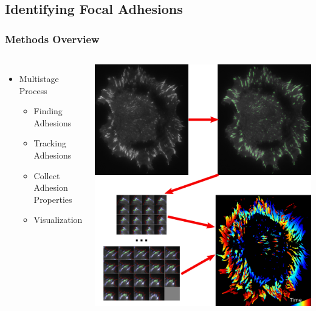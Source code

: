 \documentclass{beamer}
\newcommand{\figref}[1]{\begin{flushright}{\tiny #1 }\end{flushright}}
\begin{document}
\subsection{Identifying Focal Adhesions}
\begin{frame}
	\frametitle{Methods Overview}
	\begin{columns}
	\begin{itemize}
	\item Multistage Process
		\begin{itemize}
		\item Finding Adhesions
		\item Tracking Adhesions
		\item Collect Adhesion Properties
		\item Visualization
		\end{itemize}
	\end{itemize}
	\includegraphics[width=\textwidth]{figures/finding/method_overview/overview}
	\end{columns}
\end{frame}

\end{document}
